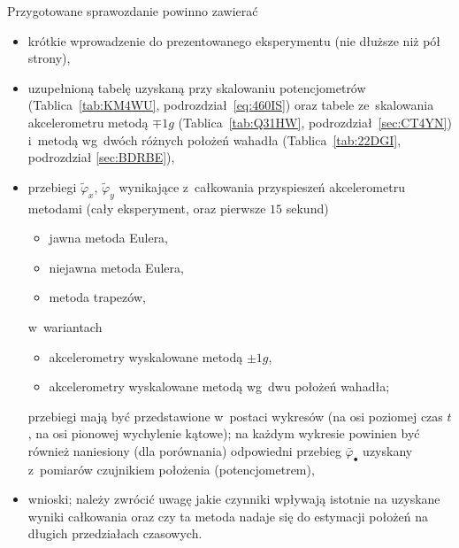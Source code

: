 \documentclass[paper=a4,DIV=12]{lpas}
\begin{document}
Przygotowane sprawozdanie powinno zawierać
\begin{itemize}
  \item krótkie wprowadzenie do prezentowanego eksperymentu (nie dłuższe niż
    pół strony),
  \item uzupełnioną tabelę uzyskaną przy skalowaniu potencjometrów
    (Tablica~\ref{tab:KM4WU}, podrozdział~\ref{eq:460IS}) oraz tabele
    ze~skalowania akcelerometru metodą $\mp 1g$ (Tablica~\ref{tab:Q31HW},
    podrozdział~\ref{sec:CT4YN}) i~metodą wg~dwóch różnych położeń wahadła
    (Tablica~\ref{tab:22DGI}, podrozdział \ref{sec:BDRBE}),
  \item przebiegi $\tilde{\varphi}_x$, $\tilde{\varphi}_y$ wynikające
    z~całkowania przyspieszeń akcelerometru metodami (cały eksperyment, oraz
    pierwsze $15$ sekund)
    \begin{itemize}
      \item jawna metoda Eulera,
      \item niejawna metoda Eulera,
      \item metoda trapezów,
    \end{itemize}
    w~wariantach
    \begin{itemize}
      \item akcelerometry wyskalowane metodą $\pm 1g$,
      \item akcelerometry wyskalowane metodą wg~dwu położeń wahadła;
    \end{itemize}
    przebiegi mają być przedstawione w~postaci wykresów (na osi poziomej czas
    $t$, na osi pionowej wychylenie kątowe); na każdym wykresie powinien być
    również naniesiony (dla porównania) odpowiedni przebieg
    $\bar{\varphi}_{\bullet}$ uzyskany z~pomiarów czujnikiem położenia
    (potencjometrem),
  \item wnioski; należy zwrócić uwagę jakie czynniki wpływają istotnie na
    uzyskane wyniki całkowania oraz czy ta metoda nadaje się do estymacji
    położeń na długich przedziałach czasowych.
\end{itemize}
\end{document}
